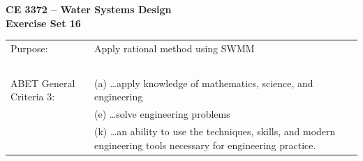 \documentclass[12pt]{article}
\begin{document}
\begin{center}
{\textbf{{ CE 3372 -- Water Systems Design} \\ {Exercise Set 16}}}
\end{center}

\begingroup
\begin{tabular}{p{2in} p{4.5in}}
Purpose: & Apply rational method using SWMM\\
~ & ~ \\
ABET General Criteria 3: & (a) \dots apply knowledge of mathematics, science, and engineering  \\
~ & (e)  \dots solve engineering problems  \\
~ & (k) \dots an ability to use the techniques, skills, and modern engineering tools necessary for engineering practice. \\
\end{tabular}
\endgroup
\end{document}
